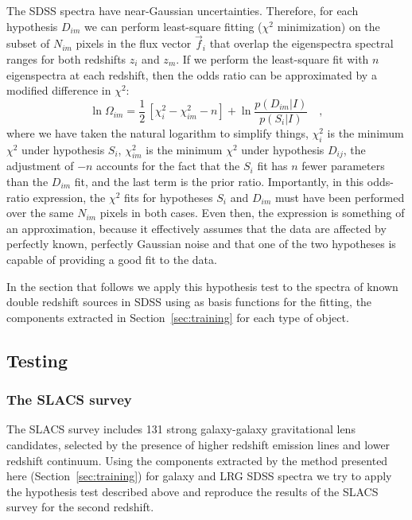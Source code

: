 \documentclass[12pt,preprint]{aastex}
\newcommand{\sectionname}{Section}
\begin{document}
The SDSS spectra have near-Gaussian uncertainties. Therefore, for each hypothesis $D_{im}$ we can perform least-square fitting ($\chi^2$ minimization) on the subset of $N_{im}$ pixels in the flux vector $\vec{f}_i$ that overlap the eigenspectra spectral ranges for both redshifts $z_i$ and $z_m$.  If we perform the least-square fit with $n$ eigenspectra at each redshift, then the odds ratio can be approximated by a modified difference in $\chi^2$:
\begin{equation}
\ln\Omega_{im}= \frac{1}{2}\,\left[\chi^2_i-\chi^2_{im}-n\right]
 +\ln\frac{p(D_{im}|I)}{p(S_i|I)} \quad,
\end{equation}
where we have taken the natural logarithm to simplify things,
$\chi^2_i$ is the minimum $\chi^2$ under hypothesis $S_i$,
$\chi^2_{im}$ is the minimum $\chi^2$ under hypothesis $D_{ij}$, the
adjustment of $-n$ accounts for the fact that the $S_i$ fit has $n$
fewer parameters than the $D_{im}$ fit, and the last term is the prior
ratio. Importantly, in this odds-ratio expression, the $\chi^2$ fits
for hypotheses $S_i$ and $D_{im}$ must have been performed over the
same $N_{im}$ pixels in both cases. Even then, the expression is
something of an approximation, because it effectively assumes that the
data are affected by perfectly known, perfectly Gaussian noise and
that one of the two hypotheses is capable of providing a good fit to
the data.

In the section that follows we apply this hypothesis test to the
spectra of known double redshift sources in SDSS using as basis
functions for the fitting, the components extracted in
\sectionname~\ref{sec:training} for each type of object.

\subsection{Testing}

\subsubsection{The SLACS survey}
The SLACS survey \citep{bolton} includes 131 strong galaxy-galaxy
gravitational lens candidates, selected by the presence of higher
redshift emission lines and lower redshift continuum. Using the
components extracted by the method presented here
(\sectionname~\ref{sec:training}) for galaxy and LRG SDSS spectra we
try to apply the hypothesis test described above and reproduce the
results of the SLACS survey for the second redshift.
\end{document}

